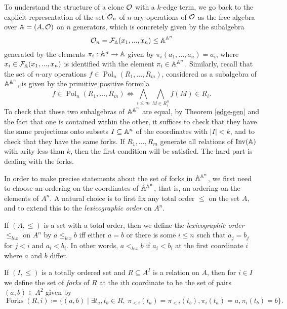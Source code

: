 \documentclass[letterpaper,11pt]{article}
\DeclareMathOperator{\Pol}{Pol}
\DeclareMathOperator{\Inv}{Inv}
\DeclareMathOperator{\Forks}{Forks}
\begin{document}
To understand the structure of a clone $\mathcal{O}$ with a $k$-edge term, we go back to the explicit representation of the set $\mathcal{O}_n$ of $n$-ary operations of $\mathcal{O}$ as the free algebra over $\mathbb{A} = (A,\mathcal{O})$ on $n$ generators, which is concretely given by the subalgebra
\[
\mathcal{O}_n = \mathcal{F}_{\mathbb{A}}(x_1, ..., x_n) \le \mathbb{A}^{\mathbb{A}^n}
\]
generated by the elements $\pi_i : \mathbb{A}^n \rightarrow \mathbb{A}$ given by $\pi_i(a_1, ..., a_n) = a_i$, where $x_i \in \mathcal{F}_{\mathbb{A}}(x_1, ..., x_n)$ is identified with the element $\pi_i \in \mathbb{A}^{\mathbb{A}^n}$. Similarly, recall that the set of $n$-ary operations $f \in \Pol_n(R_1, ..., R_m)$, considered as a subalgebra of $\mathbb{A}^{\mathbb{A}^n}$, is given by the primitive positive formula
\[
f \in \Pol_n(R_1, ..., R_m) \iff \bigwedge_{i \le m} \bigwedge_{M \in R_i^n} f(M) \in R_i.
\]
To check that these two subalgebras of $\mathbb{A}^{\mathbb{A}^n}$ are equal, by Theorem \ref{edge-gen} and the fact that one is contained within the other, it suffices to check that they have the same projections onto subsets $I \subseteq \mathbb{A}^n$ of the coordinates with $|I| < k$, and to check that they have the same forks. If $R_1, ..., R_m$ generate all relations of $\Inv(\bA)$ with arity less than $k$, then the first condition will be satisfied. The hard part is dealing with the forks.

In order to make precise statements about the set of forks in $\mathbb{A}^{\mathbb{A}^n}$, we first need to choose an ordering on the coordinates of $\mathbb{A}^{\mathbb{A}^n}$, that is, an ordering on the elements of $A^n$. A natural choice is to first fix any total order $\le$ on the set $A$, and to extend this to the \emph{lexicographic order} on $A^n$.

\begin{defn} If $(A, \le)$ is a set with a total order, then we define the \emph{lexicographic order} $\le_{lex}$ on $A^n$ by $a \le_{lex} b$ iff either $a = b$ or there is some $i \le n$ such that $a_j = b_j$ for $j < i$ and $a_i < b_i$. In other words, $a <_{lex} b$ if $a_i < b_i$ at the first coordinate $i$ where $a$ and $b$ differ.
\end{defn}

\begin{defn} If $(I,\le)$ is a totally ordered set and $R \subseteq A^I$ is a relation on $A$, then for $i \in I$ we define the set of \emph{forks} of $R$ at the $i$th coordinate to be the set of pairs $(a,b) \in A^2$ given by
\[
\Forks(R,i) \coloneqq \{(a,b) \mid \exists t_a, t_b \in R,\ \pi_{<i}(t_a) = \pi_{<i}(t_b), \pi_i(t_a) = a, \pi_i(t_b) = b\}.
\]
\end{defn}
\end{document}

